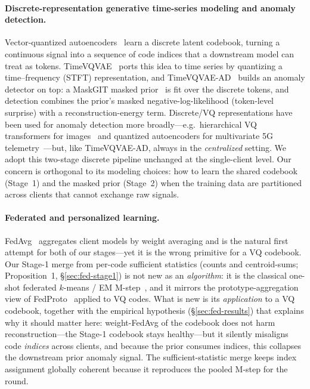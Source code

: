 \documentclass[11pt]{article}
\theoremstyle{plain}
\theoremstyle{definition}
\begin{document}
\paragraph{Discrete-representation generative time-series modeling and anomaly detection.}
Vector-quantized autoencoders~\cite{van_den_oord2017neural} learn a discrete latent
codebook, turning a continuous signal into a sequence of code indices that a
downstream model can treat as tokens. TimeVQVAE~\cite{lee2023timevqvae} ports this
idea to time series by quantizing a time--frequency (STFT) representation, and
TimeVQVAE-AD~\cite{lee2024timevqvaead} builds an anomaly detector on top: a MaskGIT
masked prior~\cite{chang2022maskgit} is fit over the discrete tokens, and detection
combines the prior's masked negative-log-likelihood (token-level surprise) with a
reconstruction-energy term. Discrete/VQ representations have been used for anomaly
detection more broadly---e.g.\ hierarchical VQ transformers for
images~\cite{lu2023hvqtrans} and quantized autoencoders for multivariate 5G
telemetry~\cite{trappolini2025qaed}---but, like TimeVQVAE-AD, always in the
\emph{centralized} setting. We adopt this two-stage discrete pipeline unchanged at
the single-client level. Our concern is orthogonal to its modeling choices: how to
learn the shared codebook (Stage~1) and the masked prior (Stage~2) when the
training data are partitioned across clients that cannot exchange raw signals.

\paragraph{Federated and personalized learning.}
FedAvg~\cite{mcmahan2017fedavg} aggregates client models by weight averaging and is
the natural first attempt for both of our stages---yet it is the wrong primitive for
a VQ codebook. Our Stage-1 merge from per-code sufficient statistics (counts and
centroid-sums; Proposition~1, \S\ref{sec:fed-stage1}) is not new as an
\emph{algorithm}: it is the classical one-shot federated $k$-means / EM
M-step~\cite{dennis2021kfed}, and
it mirrors the prototype-aggregation view of FedProto~\cite{tan2022fedproto} applied
to VQ codes. What is new is its \emph{application} to a VQ codebook, together with
the empirical hypothesis (\S\ref{sec:fed-results}) that
explains why it should matter here: weight-FedAvg of the codebook does not harm
reconstruction---the Stage-1 codebook stays healthy---but it
silently misaligns code \emph{indices} across clients, and because the prior consumes
indices, this collapses the downstream prior anomaly signal. The sufficient-statistic
merge keeps index assignment globally coherent because it reproduces the pooled
M-step for the round.
\end{document}
